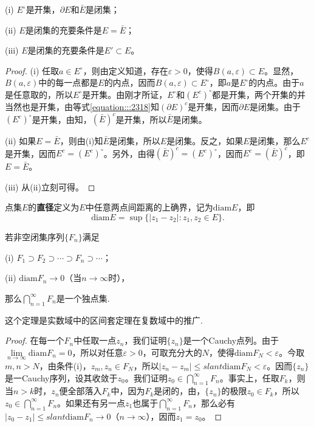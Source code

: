\documentclass[../../main.tex]{subfiles}
\begin{document}
\begin{proposition}\label{proposition:开集,闭集的充要条件}
(i) \(E^\circ\)是开集，\(\partial E\)和\(\bar{E}\)是闭集；

(ii) \(E\)是闭集的充要条件是\(E = \bar{E}\)；

(iii) \(E\)是闭集的充要条件是\(E' \subset E\)。
\end{proposition}
\begin{proof}
(i) 任取\(a \in E^\circ\)，则由定义知道，存在\(\varepsilon > 0\)，使得\(B(a, \varepsilon) \subset E\)。显然，\(B(a, \varepsilon)\)中的每一点都是\(E\)的内点，因而\(B(a, \varepsilon) \subset E^\circ\)，即\(a\)是\(E^\circ\)的内点。由于\(a\)是任意取的，所以\(E^\circ\)是开集。由刚才所证，\(E^\circ\)和\((E^c)^\circ\)都是开集，两个开集的并当然也是开集，由等式\eqref{equation:::2318}知\((\partial E)^c\)是开集，因而\(\partial E\)是闭集。由于\((E^c)^\circ\)是开集，由知，\((\bar{E})^c\)是开集，所以\(\bar{E}\)是闭集。

(ii) 如果\(E = \bar{E}\)，则由(i)知\(\bar{E}\)是闭集，所以\(E\)是闭集。反之，如果\(E\)是闭集，那么\(E^c\)是开集，因而\(E^c = (E^c)^\circ\)。另外，由得\((\bar{E})^c = (E^c)^\circ\)，因而\(E^c = (\bar{E})^c\)，即\(E = \bar{E}\)。

(iii) 从(ii)立刻可得。 
\end{proof}

\begin{definition}
点集\(E\)的\textbf{直径}定义为\(E\)中任意两点间距离的上确界，记为\(\mathrm{diam}E\)，即
\[
\mathrm{diam}E = \sup\{ | z_1 - z_2 | : z_1, z_2 \in E \}.
\]
\end{definition}

\begin{theorem}[Cantor闭集套定理]\label{theorem:Cantor闭集套定理}
若非空闭集序列\(\{ F_n \}\)满足

(i) \(F_1 \supset F_2 \supset \cdots \supset F_n \supset \cdots\)；

(ii) \(\mathrm{diam}F_n \to 0\)（当\(n \to \infty\)时），

那么\(\bigcap_{n = 1}^\infty F_n\)是一个独点集.
\end{theorem}
\begin{note}
这个定理是实数域中的区间套定理在复数域中的推广.
\end{note}
\begin{proof}
在每一个\(F_n\)中任取一点\(z_n\)，我们证明\(\{ z_n \}\)是一个Cauchy点列。由于\(\lim\limits_{n \to \infty}\mathrm{diam}F_n = 0\)，所以对任意\(\varepsilon > 0\)，可取充分大的\(N\)，使得\(\mathrm{diam}F_N < \varepsilon\)。今取\(m, n > N\)，由条件(i)，\(z_m, z_n \in F_N\)，所以\(| z_n - z_m | \leqslant slant \mathrm{diam}F_N < \varepsilon\)。因而\(\{ z_n \}\)是一Cauchy序列，设其收敛于\(z_0\)。我们证明\(z_0 \in \bigcap_{n = 1}^\infty F_n\)。事实上，任取\(F_k\)，则当\(n > k\)时，\(z_n\)便全部落入\(F_k\)中，因为\(F_k\)是闭的，由，\(\{ z_n \}\)的极限\(z_0 \in F_k\)，所以\(z_0 \in \bigcap_{n = 1}^\infty F_n\)。如果还有另一点\(z_1\)也属于\(\bigcap_{n = 1}^\infty F_n\)，那么必有\(| z_0 - z_1 | \leqslant slant \mathrm{diam}F_n \to 0\)（\(n \to \infty\)），因而\(z_1 = z_0\)。 
\end{proof}
\end{document}
